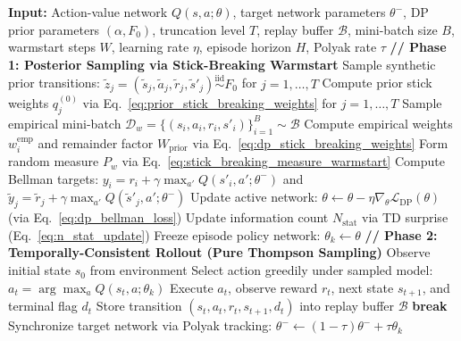 \documentclass[10pt]{article}
\begin{document}
\begin{algorithm}[t]
\caption{Pure Thompson Sampling via DP-BNN for Deep Q-Networks (DP-DQN)}
\label{alg: deep-rl-dp}
{\small
\begin{algorithmic}[1]
\State \textbf{Input:} Action-value network $Q(s, a; \theta)$, target network parameters $\theta^-$, DP prior parameters $(\alpha, F_0)$, truncation level $T$, replay buffer $\mathcal{B}$, mini-batch size $B$, warmstart steps $W$, learning rate $\eta$, episode horizon $H$, Polyak rate $\tau$
    \State \textbf{// Phase 1: Posterior Sampling via Stick-Breaking Warmstart}
    \State Sample synthetic prior transitions: $\tilde{z}_j = (\tilde{s}_j, \tilde{a}_j, \tilde{r}_j, \tilde{s}'_j) \stackrel{\text{iid}}{\sim} F_0$ for $j = 1, \dots, T$
    \State Compute prior stick weights $q_j^{(0)}$ via Eq.~\eqref{eq:prior_stick_breaking_weights} for $j = 1, \dots, T$
        \State Sample empirical mini-batch $\mathcal{D}_w = \{(s_i, a_i, r_i, s'_i)\}_{i=1}^B \sim \mathcal{B}$
        \State Compute empirical weights $w_i^{\text{emp}}$ and remainder factor $W_{\text{prior}}$ via Eq.~\eqref{eq:dp_stick_breaking_weights}
        \State Form random measure $P_w$ via Eq.~\eqref{eq:stick_breaking_measure_warmstart}
        \State Compute Bellman targets: $y_i = r_i + \gamma \max_{a'} Q(s'_i, a'; \theta^-)$ and $\tilde{y}_j = \tilde{r}_j + \gamma \max_{a'} Q(\tilde{s}'_j, a'; \theta^-)$
        \State Update active network: $\theta \leftarrow \theta - \eta \nabla_\theta \mathcal{L}_{\text{DP}}(\theta)$ \quad (via Eq.~\eqref{eq:dp_bellman_loss})
        \State Update information count $N_{\text{stat}}$ via TD surprise (Eq.~\eqref{eq:n_stat_update})
    \EndFor
    \State Freeze episode policy network: $\theta_k \leftarrow \theta$
    \State \textbf{// Phase 2: Temporally-Consistent Rollout (Pure Thompson Sampling)}
    \State Observe initial state $s_0$ from environment
        \State Select action greedily under sampled model: $a_t = \arg\max_a Q(s_t, a; \theta_k)$
        \State Execute $a_t$, observe reward $r_t$, next state $s_{t+1}$, and terminal flag $d_t$
        \State Store transition $(s_t, a_t, r_t, s_{t+1}, d_t)$ into replay buffer $\mathcal{B}$
         \textbf{break} \EndIf
    \EndFor
    \State Synchronize target network via Polyak tracking: $\theta^- \leftarrow (1 - \tau) \theta^- + \tau \theta_k$
\EndFor
\end{algorithmic}
}
\end{algorithm}
\end{document}
